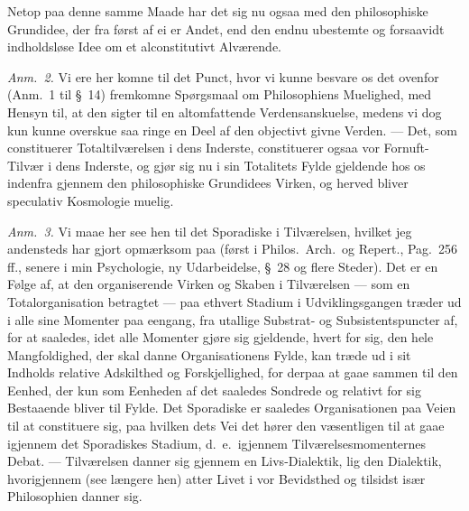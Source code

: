 \documentclass[12pt,a4paper]{book}
\newcommand{\apage}[1]{\marginnote{\footnotesize\textit{[#1]}}}
\begin{document}
{\small Netop paa denne samme Maade har det sig nu ogsaa med den philosophiske
Grundidee, der fra først af ei er Andet, end den endnu ubestemte og forsaavidt
indholdsløse Idee om et alconstitutivt Alværende.\par}

{\small\emph{Anm.~2.} Vi ere her komne til det Punct, hvor vi kunne besvare os det
ovenfor (Anm.~1 til \S~14) fremkomne Spørgsmaal om Philosophiens Muelighed, med
Hensyn til, at den sigter til en altomfattende Verdensanskuelse, medens vi dog kun
kunne overskue saa ringe en Deel af den objectivt givne Verden. --- Det, som
constituerer Totaltilværelsen i dens Inderste, constituerer ogsaa vor Fornuft-Tilvær
i dens Inderste, og gjør sig nu i sin Totalitets Fylde gjeldende hos os indenfra
gjennem den philosophiske Grundidees Virken, og herved bliver speculativ Kosmologie
muelig.\par}
  \apage{62}
{\small

\emph{Anm.~3.} Vi maae her see hen til det Sporadiske i Tilværelsen, hvilket
jeg andensteds har gjort opmærksom paa (først i Philos.\ Arch.\ og Repert., Pag.\ 256
ff., senere i min Psychologie, ny Udarbeidelse, \S~28 og flere Steder). Det er en
Følge af, at den organiserende Virken og Skaben i Tilværelsen --- som en
Totalorganisation betragtet --- paa ethvert Stadium i Udviklingsgangen træder ud i
alle sine Momenter paa eengang, fra utallige Substrat- og Subsistentspuncter af, for
at saaledes, idet alle Momenter gjøre sig gjeldende, hvert for sig, den hele
Mangfoldighed, der skal danne Organisationens Fylde, kan træde ud i sit Indholds
relative Adskilthed og Forskjellighed, for derpaa at gaae sammen til den Eenhed, der
kun som Eenheden af det saaledes Sondrede og relativt for sig Bestaaende bliver til
Fylde. Det Sporadiske er saaledes Organisationen paa Veien til at constituere sig,
paa hvilken dets Vei det hører den væsentligen til at gaae igjennem det Sporadiskes
Stadium, d.\ e.\ igjennem Tilværelsesmomenternes Debat. --- Tilværelsen danner sig
gjennem en Livs-Dialektik, lig den Dialektik, hvorigjennem (see længere hen) atter
Livet i vor Bevidsthed og tilsidst især Philosophien danner sig.\par}
\end{document}
